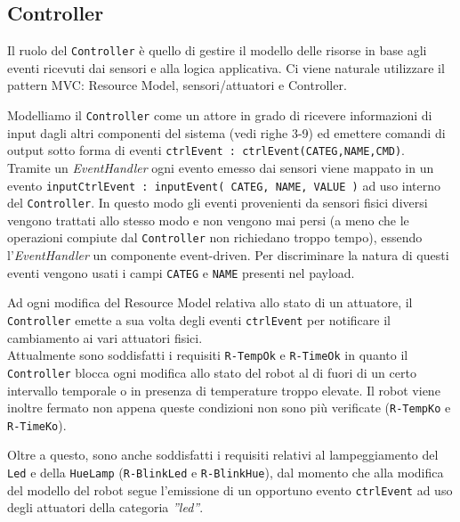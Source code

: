 \documentclass{../llncs}
\newcommand{\codescript}[1]{{\mbox{\small{\texttt{#1}}}}\xspace}
\newcommand{\code}[1]{{\color{blue}\small{\texttt{#1}}}}
\begin{document}
\subsection{Controller}
Il ruolo del \texttt{Controller} è quello di gestire il modello delle risorse in base agli eventi ricevuti dai sensori e alla logica applicativa. Ci viene naturale utilizzare il pattern MVC: Resource Model, sensori/attuatori e Controller.

Modelliamo il \texttt{Controller} come un attore in grado di ricevere informazioni di input dagli altri componenti del sistema (vedi righe 3-9) ed emettere comandi di output sotto forma di eventi \codescript{ctrlEvent : ctrlEvent(CATEG,NAME,CMD)}.\\



Tramite un \emph{EventHandler} ogni evento emesso dai sensori viene mappato in un evento \codescript{inputCtrlEvent : inputEvent( CATEG, NAME, VALUE )} ad uso interno del \texttt{Controller}. In questo modo gli eventi provenienti da sensori fisici diversi vengono trattati allo stesso modo e non vengono mai persi (a meno che le operazioni compiute dal \texttt{Controller} non richiedano troppo tempo), essendo l'\emph{EventHandler} un componente event-driven. Per discriminare la natura di questi eventi vengono usati i campi \codescript{CATEG} e \codescript{NAME} presenti nel payload.

Ad ogni modifica del Resource Model relativa allo stato di un attuatore, il \texttt{Controller} emette a sua volta degli eventi \codescript{ctrlEvent} per notificare il cambiamento ai vari attuatori fisici.\\



Attualmente sono soddisfatti i requisiti \code{R-TempOk} e \code{R-TimeOk} in quanto il \texttt{Controller} blocca ogni modifica allo stato del robot al di fuori di un certo intervallo temporale o in presenza di temperature troppo elevate. Il robot viene inoltre fermato non appena queste condizioni non sono più verificate (\code{R-TempKo} e \code{R-TimeKo}).

Oltre a questo, sono anche soddisfatti i requisiti relativi al lampeggiamento del \texttt{Led} e della \texttt{HueLamp} (\code{R-BlinkLed} e \code{R-BlinkHue}), dal momento che alla modifica del modello del robot segue l'emissione di un opportuno evento \codescript{ctrlEvent} ad uso degli attuatori della categoria \emph{''led''}.
\end{document}
